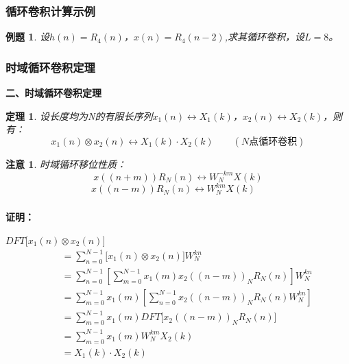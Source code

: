 \documentclass[notheorems,compress,mathserif,table]{beamer}
\newtheorem{theorem}{定理}
\newtheorem{example}{例题}
\newtheorem{zhuyi}{注意}
\begin{document}
\begin{frame}[shrink]\frametitle{循环卷积计算示例}%
\begin{example}
设$h(n)=R_4(n)$，$x(n) = R_4(n-2)$,求其循环卷积，设$L=8$。
\end{example}
\end{frame}
%
%
%
\begin{frame}[shrink]\frametitle{时域循环卷积定理}%
\textbf{二、时域循环卷积定理}
\begin{theorem}
设长度均为N的有限长序列$x_1(n)\leftrightarrow X_1(k)$，$x_2(n)\leftrightarrow X_2(k)$，则有：
$$x_1(n)\otimes x_2(n) \longleftrightarrow X_1(k)\cdot X_2(k) \quad\quad (\mbox{$N$点循环卷积})$$
\end{theorem}
\begin{zhuyi}
时域循环移位性质：
$$x((n+m))R_N(n)\longleftrightarrow W_N^{-km}X(k)$$
$$x((n-m))R_N(n)\longleftrightarrow W_N^{km}X(k)\quad$$
\end{zhuyi}
\end{frame}

\begin{frame}[shrink]\frametitle{}%
\textbf{证明：}

$DFT\big[ x_1(n)\otimes x_2(n)\big]$
\begin{equation*}
\begin{split}
    \quad
         &= \sum_{n=0}^{N-1}\bigg[x_1(n)\otimes x_2(n)\bigg]W_N^{kn} \\
         &= \sum_{n=0}^{N-1}\left[\sum_{m=0}^{N-1}x_1(m) x_2((n-m))_N R_N(n) \right] W_N^{kn}   \\
         &= \sum_{m=0}^{N-1}x_1(m)\left[ \sum_{n=0}^{N-1} x_2((n-m))_N R_N(n) W_N^{kn} \right]   \\
         &= \sum_{m=0}^{N-1}x_1(m) DFT\bigg[  x_2((n-m))_N R_N(n) \bigg]  \quad   \\
         &= \sum_{m=0}^{N-1}x_1(m)W_N^{km} X_2(k)  \;\qquad\qquad      \\
         &= X_1(k)\cdot X_2(k)
\end{split}
\end{equation*}
\end{frame}
%
%
\end{document}
